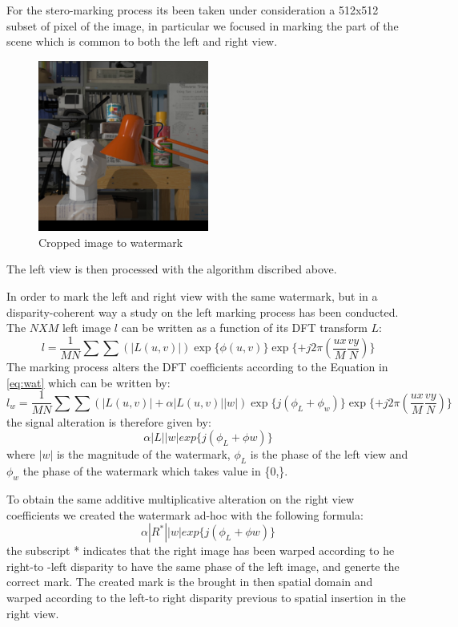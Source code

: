 For the stero-marking process its been taken under consideration a 512x512 subset of pixel of the image, in particular we focused in marking the part of the scene which is common to both the left and right view.

\begin{figure}[h!]
\centering
\includegraphics[width=0.5\textwidth]{./img/squared.png}
\caption{\small{Cropped image to watermark}}
\label{fig:cropped}
\end{figure}

The left view is then processed with the algorithm discribed above.\newline 

In order to mark the left and right view with the same watermark, but in a disparity-coherent way a study on the left marking process has been conducted.
The $NXM$ left image $l$ can be written as a function of its DFT transform $L$:
$$ l =  \frac{1}{MN}\sum\sum(|L(u,v)|)\exp\{\phi (u,v)\} \exp\{+j2\pi(\frac{ux}{M}\frac{vy}{N})\}  $$
The marking process alters the DFT coefficients according to the Equation in \ref{eq:wat}
which can be written by:
$$ l_{w} = \frac{1}{MN}\sum\sum(|L(u,v)| + \alpha|L(u,v)||w|)\exp\{j(\phi_{L}+\phi_{w})\}\exp\{+j2\pi(\frac{ux}{M}\frac{vy}{N})\} $$
the signal alteration is therefore given by:
$$ \alpha|L||w|exp\{j(\phi_{L}+\phi{w})\} $$ 
where $|w|$ is the magnitude of the watermark, $\phi_{L}$ is the phase of the left view and $ \phi_{w}$ the phase of the watermark which takes value in \{0,\pi\}.

To obtain the same additive multiplicative alteration on the right view coefficients we created the watermark ad-hoc with the following formula: 
$$ \alpha|R^{*}||w|exp\{j(\phi_{L}+\phi{w})\} $$ 
the subscript * indicates that the right image has been warped according to he right-to -left disparity to have the same phase of the left image, and generte the correct mark.
The created mark is the brought in then spatial domain and warped according to the left-to right disparity previous to spatial insertion in the right view.

